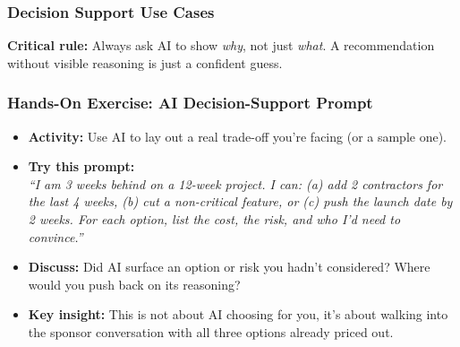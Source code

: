 \begin{frame}[fragile]\frametitle{Decision Support Use Cases}

\begin{center}
\end{center}

\vspace{0.3em}
\textbf{Critical rule:} Always ask AI to show \textit{why}, not just \textit{what}. A recommendation without visible reasoning is just a confident guess.

\end{frame}

\begin{frame}[fragile]\frametitle{Hands-On Exercise: AI Decision-Support Prompt}

\begin{itemize}
  \item \textbf{Activity:} Use AI to lay out a real trade-off you're facing (or a sample one).
  \item \textbf{Try this prompt:}\\
    \textit{``I am 3 weeks behind on a 12-week project. I can: (a) add 2 contractors for the last 4 weeks, (b) cut a non-critical feature, or (c) push the launch date by 2 weeks. For each option, list the cost, the risk, and who I'd need to convince.''}
  \item \textbf{Discuss:} Did AI surface an option or risk you hadn't considered? Where would you push back on its reasoning?
  \item \textbf{Key insight:} This is not about AI choosing for you, it's about walking into the sponsor conversation with all three options already priced out.
\end{itemize}

\end{frame}

